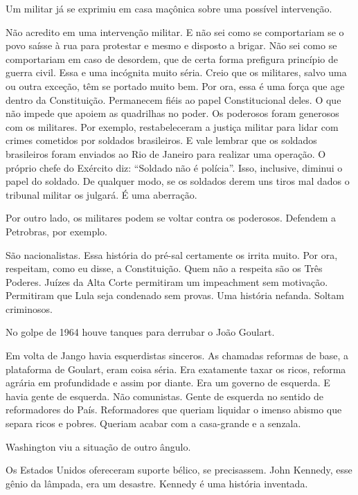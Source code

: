  Um militar já se exprimiu em casa maçônica sobre uma possível
intervenção.

 Não acredito em uma intervenção militar. E não sei como se
comportariam se o povo saísse à rua para protestar e mesmo e disposto a
brigar. Não sei como se comportariam em caso de desordem, que de certa
forma prefigura princípio de guerra civil. Essa e uma incógnita muito
séria. Creio que os militares, salvo uma ou outra exceção, têm se
portado muito bem. Por ora, essa é uma força que age dentro da
Constituição. Permanecem fiéis ao papel Constitucional deles. O que não
impede que apoiem as quadrilhas no poder. Os poderosos foram generosos
com os militares. Por exemplo, restabeleceram a justiça militar para
lidar com crimes cometidos por soldados brasileiros. E vale lembrar que
os soldados brasileiros foram enviados ao Rio de Janeiro para realizar
uma operação. O próprio chefe do Exército diz: ``Soldado não é
polícia''. Isso, inclusive, diminui o papel do soldado. De qualquer
modo, se os soldados derem uns tiros mal dados o tribunal militar os
julgará. É uma aberração.

 Por outro lado, os militares podem se voltar contra os poderosos.
Defendem a Petrobras, por exemplo.

 São nacionalistas. Essa história do pré-sal certamente os irrita
muito. Por ora, respeitam, como eu disse, a Constituição. Quem não a
respeita são os Três Poderes. Juízes da Alta Corte permitiram um
impeachment sem motivação. Permitiram que Lula seja condenado sem
provas. Uma história nefanda. Soltam criminosos.

\protect\hypertarget{_Hlk498086306}{}{} No golpe de 1964 houve tanques
para derrubar o João Goulart.

 Em volta de Jango havia esquerdistas sinceros. As chamadas reformas
de base, a plataforma de Goulart, eram coisa séria. Era exatamente taxar
os ricos, reforma agrária em profundidade e assim por diante. Era um
governo de esquerda. E havia gente de esquerda. Não comunistas. Gente de
esquerda no sentido de reformadores do País. Reformadores que queriam
liquidar o imenso abismo que separa ricos e pobres. Queriam acabar com a
casa-grande e a senzala.

 Washington viu a situação de outro ângulo.

 Os Estados Unidos ofereceram suporte bélico, se precisassem. John
Kennedy, esse gênio da lâmpada, era um desastre. Kennedy é uma história
inventada.

